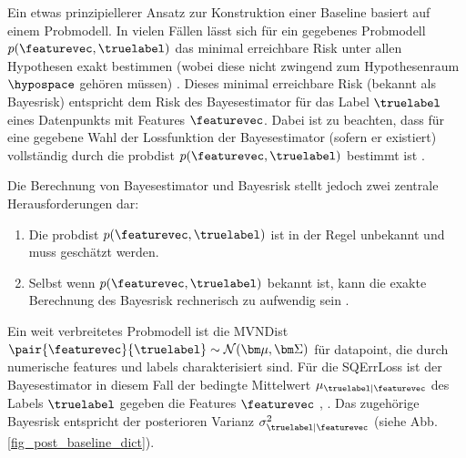 {{{{{		Ein etwas prinzipiellerer Ansatz zur Konstruktion einer Baseline basiert auf einem \gls{Probmodell}. In vielen Fällen lässt sich für ein gegebenes
		 \gls{Probmodell} $p(\featurevec,\truelabel)$ das minimal erreichbare \gls{Risk} unter allen Hypothesen exakt bestimmen (wobei diese nicht zwingend 
		 zum \gls{Hypothesenraum} $\hypospace$ gehören müssen) \cite{LC}. Dieses minimal erreichbare \gls{Risk} (bekannt als \gls{Bayesrisk}) entspricht 
		 dem \gls{Risk} des \gls{Bayesestimator} für das \gls{Label} $\truelabel$ eines \gls{Datenpunkts} mit \gls{Features} $\featurevec$. Dabei ist zu beachten,
		  dass für eine gegebene Wahl der \gls{Lossfunktion} der \gls{Bayesestimator} (sofern er existiert) vollständig durch die
		   \gls{probdist} $p(\featurevec,\truelabel)$ bestimmt ist \cite[Kap. 4]{LC}. 
		
		Die Berechnung von \gls{Bayesestimator} und \gls{Bayesrisk} stellt jedoch zwei zentrale Herausforderungen dar:
		\begin{enumerate}[label=\arabic*)]
			\item Die  \gls{probdist} $p(\featurevec,\truelabel)$ ist in der Regel unbekannt und muss geschätzt werden.
			\item Selbst wenn $p(\featurevec,\truelabel)$ bekannt ist, kann die exakte Berechnung des \gls{Bayesrisk} 
			rechnerisch zu aufwendig sein \cite{cooper1990computational}.
		\end{enumerate}
		
		Ein weit verbreitetes \gls{Probmodell} ist die \gls{MVNDist} $\pair{\featurevec}{\truelabel} \sim \mathcal{N}({\bm \mu},{\bm \Sigma})$ 
		für \gls{datapoint}, die durch numerische \gls{features} und \gls{label}s charakterisiert sind. Für die \gls{SQErrLoss} 
		ist der \gls{Bayesestimator} in diesem Fall der bedingte Mittelwert $\mu_{\truelabel|\featurevec}$ des \gls{Labels} $\truelabel$
		 gegeben die \gls{Features} $\featurevec$ \cite{LC}, \cite{GrayProbBook}. Das zugehörige \gls{Bayesrisk} entspricht der posterioren
		  Varianz $\sigma^{2}_{\truelabel|\featurevec}$ (siehe Abb. \ref{fig_post_baseline_dict}).
		
}}}}}
